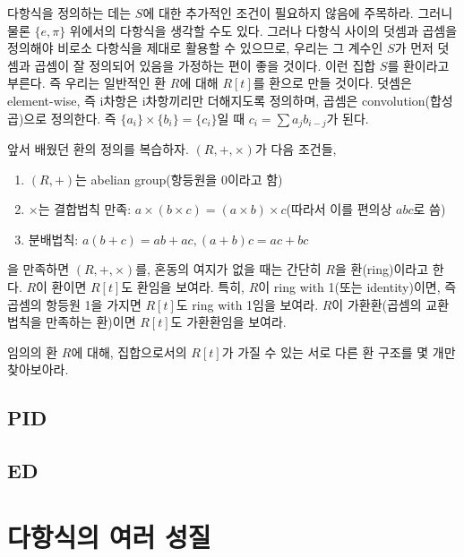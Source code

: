 다항식을 정의하는 데는 $S$에 대한 추가적인 조건이 필요하지 않음에 주목하라. 그러니 물론 $\{e, \pi\}$ 위에서의 다항식을 생각할 수도 있다. 그러나 다항식 사이의 덧셈과 곱셈을 정의해야 비로소 다항식을 제대로 활용할 수 있으므로, 우리는 그 계수인 $S$가 먼저 덧셈과 곱셈이 잘 정의되어 있음을 가정하는 편이 좋을 것이다. 이런 집합 $S$를 환이라고 부른다. 즉 우리는 일반적인 환 $R$에 대해 $R[t]$를 환으로 만들 것이다. 덧셈은 element-wise, 즉 i차항은 i차항끼리만 더해지도록 정의하며, 곱셈은 convolution(합성곱)으로 정의한다. 즉 $\{a_i\}\times\{b_i\}=\{c_i\}$일 때 $c_i=\sum a_j b_{i-j}$가 된다. 
\begin{exercise}
    앞서 배웠던 환의 정의를 복습하자. $(R, +, \times)$가 다음 조건들, 
    \begin{enumerate}
        \item $(R, +)$는 abelian group(항등원을 0이라고 함)
        \item $\times$는 결합법칙 만족: $a\times(b\times c)=(a\times b)\times c$(따라서 이를 편의상 $abc$로 씀)
        \item 분배법칙: $a(b+c)=ab+ac, (a+b)c=ac+bc$
    \end{enumerate}
    을 만족하면 $(R, +, \times)$를, 혼동의 여지가 없을 때는 간단히 $R$을 환(ring)이라고 한다. $R$이 환이면 $R[t]$도 환임을 보여라. 특히, $R$이 ring with 1(또는 identity)이면, 즉 곱셈의 항등원 1을 가지면 $R[t]$도 ring with 1임을 보여라. $R$이 가환환(곱셈의 교환법칙을 만족하는 환)이면 $R[t]$도 가환환임을 보여라. 
\end{exercise}
\begin{exercise}
    임의의 환 $R$에 대해, 집합으로서의 $R[t]$가 가질 수 있는 서로 다른 환 구조를 몇 개만 찾아보아라. 
\end{exercise}
\section{PID}
\section{ED}
\chapter{다항식의 여러 성질}
